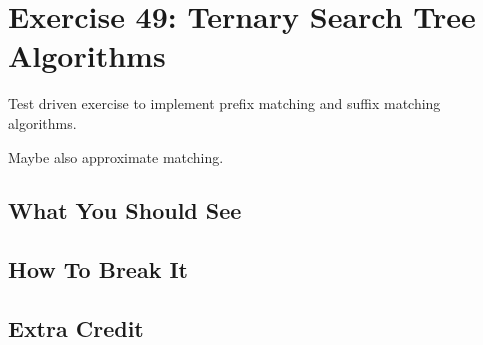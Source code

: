 \chapter{Exercise 49: Ternary Search Tree Algorithms}

Test driven exercise to implement prefix matching and suffix matching algorithms.

Maybe also approximate matching.

\section{What You Should See}


\section{How To Break It}


\section{Extra Credit}



